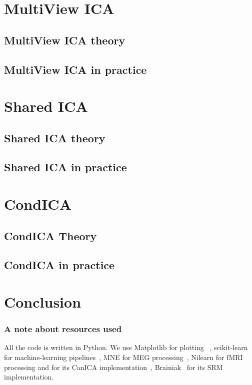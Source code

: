 \documentclass[ twoside,openright,titlepage,numbers=noenddot,%
                headinclude,footinclude,cleardoublepage=empty,abstract=on,
                BCOR=5mm,paper=a4,fontsize=11pt, 
                ]{scrreprt}
\begin{document}
\part{MultiView ICA}
\label{part:mvica}
\chapter{MultiView ICA theory}
\label{ch:mvica1}

\chapter{MultiView ICA in practice}
\label{ch:mvica2}

\part{Shared ICA}
\label{part:shica}
\chapter{Shared ICA theory}
\label{ch:shica}

\chapter{Shared ICA in practice}
\label{ch:shica2}

\part{CondICA}
\label{part:condica}
\chapter{CondICA Theory}
\label{ch:condica}

\chapter{CondICA in practice}
\label{ch:condica2}


\part{Conclusion}

\section{A note about resources used}
All the code is written in Python.
We use Matplotlib for plotting~\cite{hunter2007matplotlib} , scikit-learn for
machine-learning pipelines~\cite{pedregosa2011scikit}, MNE for MEG
processing~\cite{gramfort2013meg}, Nilearn for fMRI processing and for its CanICA implementation~\cite{abraham2014machine}, Brainiak~\cite{kumar2020brainiak} for its SRM implementation. 
\end{document}
